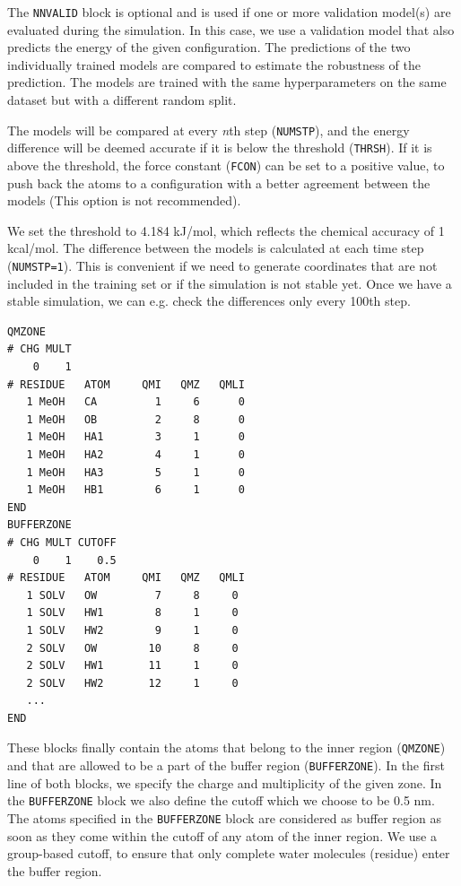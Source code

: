 The \texttt{NNVALID} block is optional and is used if one or more validation model(s) are evaluated during the simulation. In this case, we use a validation model that also predicts the energy of the given configuration. The predictions of the two individually trained models are compared to estimate the robustness of the prediction. The models are trained with the same hyperparameters on the same dataset but with a different random split.

The models will be compared at every \textit{n}th step (\texttt{NUMSTP}), and the energy difference will be deemed accurate if it is below the threshold (\texttt{THRSH}). If it is above the threshold, the force constant (\texttt{FCON}) can be set to a positive value, to push back the atoms to a configuration with a better agreement between the models (This option is not recommended). 

We set the threshold to 4.184 kJ/mol, which reflects the chemical accuracy of 1 kcal/mol. The difference between the models is calculated at each time step (\texttt{NUMSTP=1}). This is convenient if we need to generate coordinates that are not included in the training set or if the simulation is not stable yet. Once we have a stable simulation, we can e.g. check the differences only every 100th step.

\begin{lstlisting}[breaklines=true, breakatwhitespace=false]
QMZONE
# CHG MULT
    0    1
# RESIDUE   ATOM     QMI   QMZ   QMLI
   1 MeOH   CA         1     6      0
   1 MeOH   OB         2     8      0
   1 MeOH   HA1        3     1      0
   1 MeOH   HA2        4     1      0
   1 MeOH   HA3        5     1      0
   1 MeOH   HB1        6     1      0
END
BUFFERZONE
# CHG MULT CUTOFF 
    0    1    0.5
# RESIDUE   ATOM     QMI   QMZ   QMLI
   1 SOLV   OW         7     8     0
   1 SOLV   HW1        8     1     0
   1 SOLV   HW2        9     1     0
   2 SOLV   OW        10     8     0
   2 SOLV   HW1       11     1     0
   2 SOLV   HW2       12     1     0
   ...
END
\end{lstlisting}


These blocks finally contain the atoms that belong to the inner region (\texttt{QMZONE}) and that are allowed to be a part of the buffer region (\texttt{BUFFERZONE}). In the first line of both blocks, we specify the charge and multiplicity of the given zone. In the \texttt{BUFFERZONE} block we also define the cutoff which we choose to be 0.5 nm. The atoms specified in the \texttt{BUFFERZONE} block are considered as buffer region as soon as they come within the cutoff of any atom of the inner region. We use a group-based cutoff, to ensure that only complete water molecules (residue) enter the buffer region.

